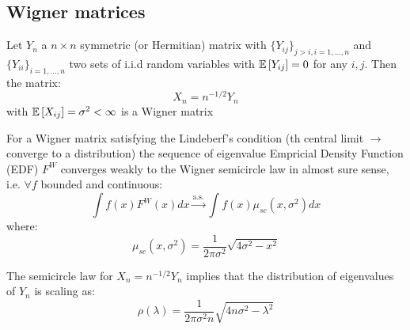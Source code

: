 \subsection{Wigner matrices}
\begin{mydefinition}
Let $Y_n$ a $n \times n$ symmetric (or Hermitian) matrix with $\{Y_{ij}\}_{j>i,i=1,\ldots,n}$ and $\{Y_{ii}\}_{i =1,\ldots,n}$ two sets of i.i.d random variables with $\mathbb{E}\left[Y_{ij}\right] = 0$ for any $i,j$. Then the matrix:
\[
X_n = n^{-1/2}Y_n
\]
with $\mathbb{E}\left[X_{ij}\right] = \sigma^2 <\infty$ is a Wigner matrix
\end{mydefinition}
\begin{mytheorem}
	For a Wigner matrix satisfying the Lindeberf's condition (th central limit $\to$ converge to a distribution) the sequence of eigenvalue Empricial Density Function (EDF) $F^W$ converges weakly to the Wigner semicircle law in almost sure sense, i.e. $\forall f$ bounded and continuous:
	\[
	\int f(x)F^W(x)dx \xrightarrow[]{\text{a.s.}} \int f(x) \mu_{sc} (x, \sigma^2)dx
	\]
where:
\[
\mu_{sc}(x,\sigma^2) = \frac{1}{2 \pi \sigma^2}\sqrt{4\sigma^2 -x^2}
\]
\end{mytheorem}
The semicircle law for $X_n = n^{-1/2}Y_n$ implies that the distribution of eigenvalues of $Y_n$ is scaling as:
\[
\rho(\lambda) = \frac{1}{2 \pi \sigma^2 n}\sqrt{4 n \sigma^2 - \lambda^2}
\]
